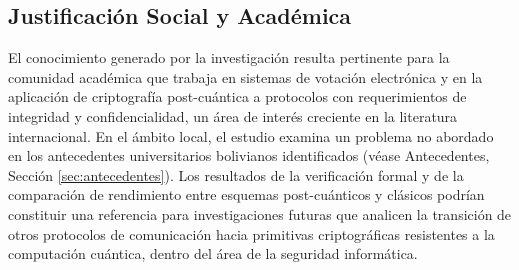 \subsection{Justificación Social y Académica}

El conocimiento generado por la investigación resulta pertinente para la comunidad académica que trabaja en sistemas de votación electrónica y en la aplicación de criptografía post-cuántica a protocolos con requerimientos de integridad y confidencialidad, un área de interés creciente en la literatura internacional. En el ámbito local, el estudio examina un problema no abordado en los antecedentes universitarios bolivianos identificados (véase Antecedentes, Sección \ref{sec:antecedentes}). Los resultados de la verificación formal y de la comparación de rendimiento entre esquemas post-cuánticos y clásicos podrían constituir una referencia para investigaciones futuras que analicen la transición de otros protocolos de comunicación hacia primitivas criptográficas resistentes a la computación cuántica, dentro del área de la seguridad informática.